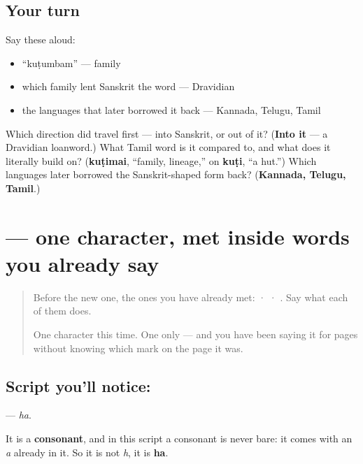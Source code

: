 \subsection*{Your turn}
Say these aloud:

\begin{itemize}
\raggedright
  \item \textquotedblleft{}kuṭumbam\textquotedblright{} — family
  \item which family lent Sanskrit the word — Dravidian
  \item the languages that later borrowed it back — Kannada, Telugu, Tamil
\end{itemize}

\begin{tcolorbox}[breakable,colback=teal!4,colframe=teal!35!black,title={Before you move on}]
Which direction did  travel first — into Sanskrit, or out of it? (\textbf{Into it} — a Dravidian loanword.) What Tamil word is it compared to, and what does it literally build on? (\textbf{kuṭimai}, \textquotedblleft{}family, lineage,\textquotedblright{} on \textbf{kuṭi}, \textquotedblleft{}a hut.\textquotedblright{}) Which languages later borrowed the Sanskrit-shaped form back? (\textbf{Kannada, Telugu, Tamil}.)
\end{tcolorbox}
\section[\texorpdfstring{\sk{ह} (ha)}{ह (ha)}]{ — one character, met inside words you already say}

\label{lesson:SA-S114-letter-ha}



\begin{quote}
Before the new one, the ones you have already met:  ·  · . Say what each of them does.

One character this time. One only — and you have been saying it for pages without knowing which mark on the page it was.
\end{quote}

\subsection*{Script you'll notice: }
\textbf{} — \emph{ha}.

It is a \textbf{consonant}, and in this script a consonant is never bare: it comes with an \emph{a} already in it. So it is not \emph{h}, it is \textbf{ha}.

